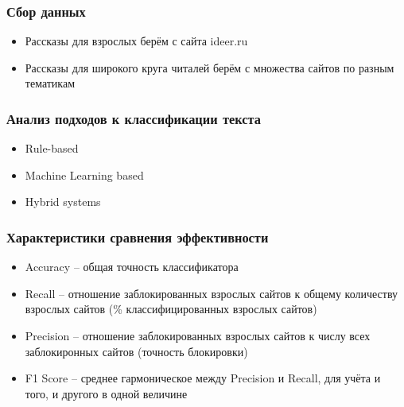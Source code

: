 \documentclass[xetex,mathserif,serif]{beamer}
\begin{document}
	\begin{frame}
		\frametitle{Сбор данных}
		\begin{itemize}
			\item Рассказы для взрослых берём с сайта ideer.ru
			\item Рассказы для широкого круга читалей берём с множества сайтов по разным тематикам
		\end{itemize}
	\end{frame}		
	
	\begin{frame}
		\frametitle{Анализ подходов к классификации текста}
		\begin{itemize}
			\item Rule-based
			\item Machine Learning based
			\item Hybrid systems
		\end{itemize}
	\end{frame}	
	
	\begin{frame}
		\frametitle{Характеристики сравнения эффективности}
		\begin{itemize}
			\item Accuracy – общая точность классификатора
			\item Recall – отношение заблокированных взрослых сайтов к общему количеству взрослых сайтов (\% классифицированных взрослых сайтов)
			\item Precision – отношение заблокированных взрослых сайтов к числу всех заблокиронных сайтов (точность блокировки)
			\item F1 Score – среднее гармоническое между Precision и Recall, для учёта и того, и другого в одной величине
		\end{itemize}
	\end{frame}
	
\end{document}
